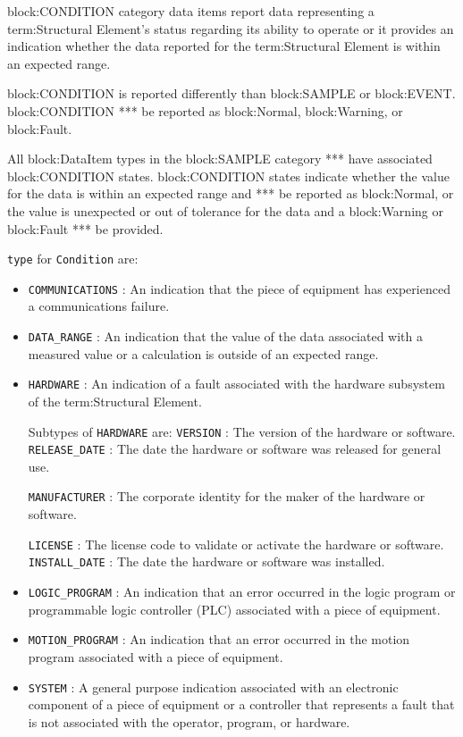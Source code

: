 {block:CONDITION} category data items report data representing a {term:Structural Element}’s status regarding its ability to operate or it provides an indication whether the data reported for the {term:Structural Element} is within an expected range.

{block:CONDITION} is reported differently than {block:SAMPLE} or {block:EVENT}.  {block:CONDITION} **\must** be reported as {block:Normal}, {block:Warning}, or {block:Fault}.

All {block:DataItem} types in the {block:SAMPLE} category **\may** have associated {block:CONDITION} states.  {block:CONDITION} states indicate whether the value for the data is within an expected range and **\must** be reported as {block:Normal}, or the value is unexpected or out of tolerance for the data and a {block:Warning} or {block:Fault} **\must** be provided.


 \texttt{type} for \texttt{Condition} are:
\begin{itemize}

\item \texttt{COMMUNICATIONS} : An indication that the piece of equipment has experienced a communications failure. 

\item \texttt{DATA_RANGE} : An indication that the value of the data associated with a measured value or a calculation is outside of an expected range. 

\item \texttt{HARDWARE} : An indication of a fault associated with the hardware subsystem of the {term:Structural Element}. 

Subtypes of \texttt{HARDWARE} are: 
\newline\tab \texttt{VERSION} : The version of the hardware or software. 
\newline\tab \texttt{RELEASE_DATE} : The date the hardware or software was released for general use.
 
\newline\tab \texttt{MANUFACTURER} : The corporate identity for the maker of the hardware or software.
 
\newline\tab \texttt{LICENSE} : The license code to validate or activate the hardware or software. 
\newline\tab \texttt{INSTALL_DATE} : The date the hardware or software was installed. 
\item \texttt{LOGIC_PROGRAM} : An indication that an error occurred in the logic program or programmable logic controller (PLC) associated with a piece of equipment. 

\item \texttt{MOTION_PROGRAM} : An indication that an error occurred in the motion program associated with a piece of equipment. 

\item \texttt{SYSTEM} : A general purpose indication associated with an electronic component of a piece of equipment or a controller that represents a fault that is not associated with the operator, program, or hardware. 

\end{itemize}


